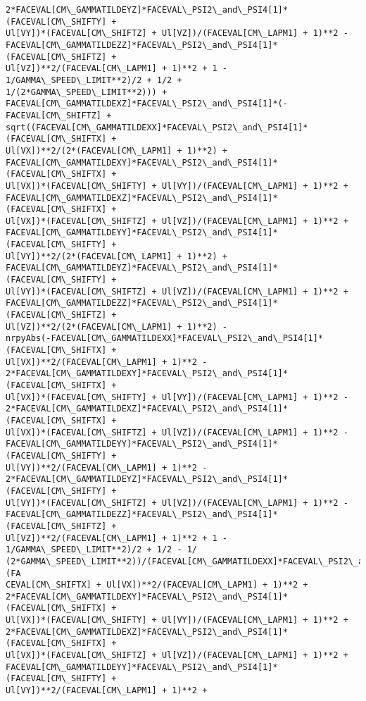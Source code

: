 \documentclass[landscape,letterpaper,10pt,english]{article}
\begin{document}
\begin{Verbatim}[commandchars=\\\{\}]
2*FACEVAL[CM\_GAMMATILDEYZ]*FACEVAL\_PSI2\_and\_PSI4[1]*(FACEVAL[CM\_SHIFTY] +
Ul[VY])*(FACEVAL[CM\_SHIFTZ] + Ul[VZ])/(FACEVAL[CM\_LAPM1] + 1)**2 -
FACEVAL[CM\_GAMMATILDEZZ]*FACEVAL\_PSI2\_and\_PSI4[1]*(FACEVAL[CM\_SHIFTZ] +
Ul[VZ])**2/(FACEVAL[CM\_LAPM1] + 1)**2 + 1 - 1/GAMMA\_SPEED\_LIMIT**2)/2 + 1/2 +
1/(2*GAMMA\_SPEED\_LIMIT**2))) +
FACEVAL[CM\_GAMMATILDEXZ]*FACEVAL\_PSI2\_and\_PSI4[1]*(-FACEVAL[CM\_SHIFTZ] +
sqrt((FACEVAL[CM\_GAMMATILDEXX]*FACEVAL\_PSI2\_and\_PSI4[1]*(FACEVAL[CM\_SHIFTX] +
Ul[VX])**2/(2*(FACEVAL[CM\_LAPM1] + 1)**2) +
FACEVAL[CM\_GAMMATILDEXY]*FACEVAL\_PSI2\_and\_PSI4[1]*(FACEVAL[CM\_SHIFTX] +
Ul[VX])*(FACEVAL[CM\_SHIFTY] + Ul[VY])/(FACEVAL[CM\_LAPM1] + 1)**2 +
FACEVAL[CM\_GAMMATILDEXZ]*FACEVAL\_PSI2\_and\_PSI4[1]*(FACEVAL[CM\_SHIFTX] +
Ul[VX])*(FACEVAL[CM\_SHIFTZ] + Ul[VZ])/(FACEVAL[CM\_LAPM1] + 1)**2 +
FACEVAL[CM\_GAMMATILDEYY]*FACEVAL\_PSI2\_and\_PSI4[1]*(FACEVAL[CM\_SHIFTY] +
Ul[VY])**2/(2*(FACEVAL[CM\_LAPM1] + 1)**2) +
FACEVAL[CM\_GAMMATILDEYZ]*FACEVAL\_PSI2\_and\_PSI4[1]*(FACEVAL[CM\_SHIFTY] +
Ul[VY])*(FACEVAL[CM\_SHIFTZ] + Ul[VZ])/(FACEVAL[CM\_LAPM1] + 1)**2 +
FACEVAL[CM\_GAMMATILDEZZ]*FACEVAL\_PSI2\_and\_PSI4[1]*(FACEVAL[CM\_SHIFTZ] +
Ul[VZ])**2/(2*(FACEVAL[CM\_LAPM1] + 1)**2) -
nrpyAbs(-FACEVAL[CM\_GAMMATILDEXX]*FACEVAL\_PSI2\_and\_PSI4[1]*(FACEVAL[CM\_SHIFTX] +
Ul[VX])**2/(FACEVAL[CM\_LAPM1] + 1)**2 -
2*FACEVAL[CM\_GAMMATILDEXY]*FACEVAL\_PSI2\_and\_PSI4[1]*(FACEVAL[CM\_SHIFTX] +
Ul[VX])*(FACEVAL[CM\_SHIFTY] + Ul[VY])/(FACEVAL[CM\_LAPM1] + 1)**2 -
2*FACEVAL[CM\_GAMMATILDEXZ]*FACEVAL\_PSI2\_and\_PSI4[1]*(FACEVAL[CM\_SHIFTX] +
Ul[VX])*(FACEVAL[CM\_SHIFTZ] + Ul[VZ])/(FACEVAL[CM\_LAPM1] + 1)**2 -
FACEVAL[CM\_GAMMATILDEYY]*FACEVAL\_PSI2\_and\_PSI4[1]*(FACEVAL[CM\_SHIFTY] +
Ul[VY])**2/(FACEVAL[CM\_LAPM1] + 1)**2 -
2*FACEVAL[CM\_GAMMATILDEYZ]*FACEVAL\_PSI2\_and\_PSI4[1]*(FACEVAL[CM\_SHIFTY] +
Ul[VY])*(FACEVAL[CM\_SHIFTZ] + Ul[VZ])/(FACEVAL[CM\_LAPM1] + 1)**2 -
FACEVAL[CM\_GAMMATILDEZZ]*FACEVAL\_PSI2\_and\_PSI4[1]*(FACEVAL[CM\_SHIFTZ] +
Ul[VZ])**2/(FACEVAL[CM\_LAPM1] + 1)**2 + 1 - 1/GAMMA\_SPEED\_LIMIT**2)/2 + 1/2 - 1/
(2*GAMMA\_SPEED\_LIMIT**2))/(FACEVAL[CM\_GAMMATILDEXX]*FACEVAL\_PSI2\_and\_PSI4[1]*(FA
CEVAL[CM\_SHIFTX] + Ul[VX])**2/(FACEVAL[CM\_LAPM1] + 1)**2 +
2*FACEVAL[CM\_GAMMATILDEXY]*FACEVAL\_PSI2\_and\_PSI4[1]*(FACEVAL[CM\_SHIFTX] +
Ul[VX])*(FACEVAL[CM\_SHIFTY] + Ul[VY])/(FACEVAL[CM\_LAPM1] + 1)**2 +
2*FACEVAL[CM\_GAMMATILDEXZ]*FACEVAL\_PSI2\_and\_PSI4[1]*(FACEVAL[CM\_SHIFTX] +
Ul[VX])*(FACEVAL[CM\_SHIFTZ] + Ul[VZ])/(FACEVAL[CM\_LAPM1] + 1)**2 +
FACEVAL[CM\_GAMMATILDEYY]*FACEVAL\_PSI2\_and\_PSI4[1]*(FACEVAL[CM\_SHIFTY] +
Ul[VY])**2/(FACEVAL[CM\_LAPM1] + 1)**2 +

\end{Verbatim}
\end{document}
